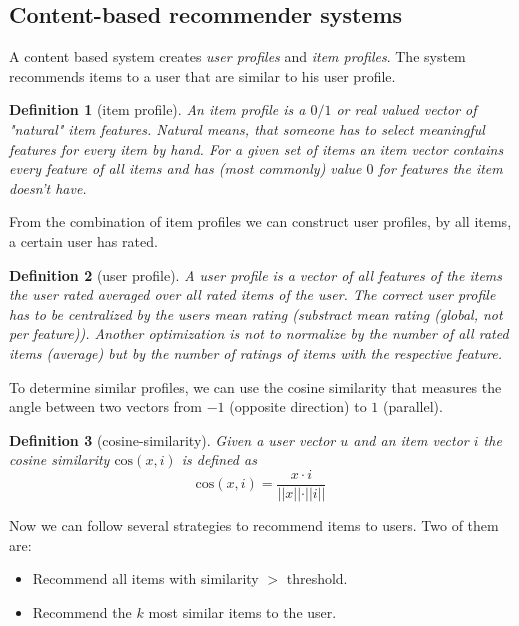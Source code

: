 \documentclass[]{article}
\newtheorem{defi}{Definition}
\begin{document}
\subsection{Content-based recommender systems}
A content based system creates \emph{user profiles} and \emph{item profiles}. The system recommends items to a user that are similar to his user profile.
\begin{defi}[item profile]
An \emph{item profile} is a $0/1$ or real valued vector of "natural" item features. Natural means, that someone has to select meaningful features for every item by hand. For a given set of items an item vector contains every feature of all items and has (most commonly) value $0$ for features the item doesn't have.
\end{defi}
From the combination of item profiles we can construct user profiles, by all items, a certain user has rated.
\begin{defi}[user profile]
A \emph{user profile} is a vector of all features of the items the user rated averaged over all rated items of the user. The correct user profile has to be centralized by the users mean rating (substract mean rating (global, not per feature)). Another optimization is not to normalize by the number of all rated items (average) but by the number of ratings of items with the respective feature.
\end{defi}
To determine similar profiles, we can use the cosine similarity that measures the angle between two vectors from $-1$ (opposite direction) to $1$ (parallel).
\begin{defi}[cosine-similarity]
Given a user vector $u$ and an item vector $i$ the cosine similarity $\text{cos}(x,i)$ is defined as 
\[
	\text{cos}(x,i) = \frac{x \cdot i}{\vert \vert x \vert \vert \cdot \vert \vert i \vert \vert}
\]
\end{defi}
Now we can follow several strategies to recommend items to users. Two of them are:
\begin{itemize}
\item Recommend all items with similarity $>$ threshold.
\item Recommend the $k$ most similar items to the user.
\end{itemize}
\end{document}
